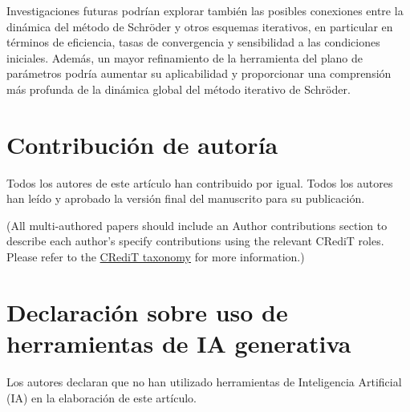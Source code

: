 \IfFileExists{aims.cls}{\documentclass{aims}}{\documentclass[11pt]{article}}
\numberwithin{equation}{section}
\theoremstyle{thmstyleone}%
\theoremstyle{thmstyletwo}%
\theoremstyle{thmstylethree}%
\begin{document}
Investigaciones futuras podrían explorar también las posibles conexiones entre la dinámica del método de Schröder y otros esquemas iterativos, en particular en términos de eficiencia, tasas de convergencia y sensibilidad a las condiciones iniciales. Además, un mayor refinamiento de la herramienta del plano de parámetros podría aumentar su aplicabilidad y proporcionar una comprensión más profunda de la dinámica global del método iterativo de Schröder.


\section*{Contribución de autoría}

Todos los autores de este artículo han contribuido por igual. Todos los autores han leído y aprobado la versión final del manuscrito para su publicación.


(All multi-authored papers should include an Author contributions section to describe each author's specify contributions using the relevant CRediT roles. Please refer to the \href{https://credit.niso.org/}{CRediT taxonomy} for more information.)

\section*{Declaración sobre uso de herramientas de IA generativa}
Los autores declaran que no han utilizado herramientas de Inteligencia Artificial (IA) en la elaboración de este artículo.


\end{document}
